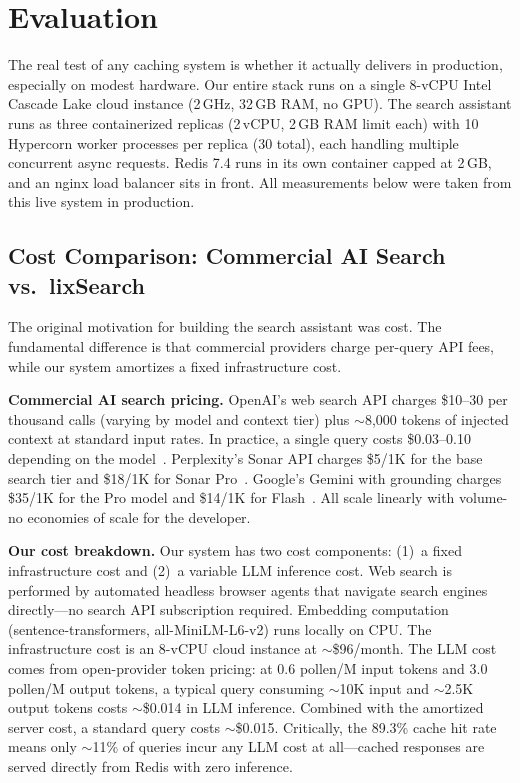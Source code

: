 \documentclass[conference]{IEEEtran}
\begin{document}
\section{Evaluation}
\label{sec:evaluation}

The real test of any caching system is whether it actually delivers in production, especially on modest hardware. Our entire stack runs on a single 8-vCPU Intel Cascade Lake cloud instance (2\,GHz, 32\,GB RAM, no GPU). The search assistant runs as three containerized replicas (2\,vCPU, 2\,GB RAM limit each) with 10 Hypercorn worker processes per replica (30 total), each handling multiple concurrent async requests. Redis 7.4 runs in its own container capped at 2\,GB, and an nginx load balancer sits in front. All measurements below were taken from this live system in production.

\subsection{Cost Comparison: Commercial AI Search vs.\ lixSearch}

The original motivation for building the search assistant was cost. The fundamental difference is that commercial providers charge per-query API fees, while our system amortizes a fixed infrastructure cost.

\textbf{Commercial AI search pricing.} OpenAI's web search API charges \$10--30 per thousand calls (varying by model and context tier) plus ${\sim}$8{,}000 tokens of injected context at standard input rates. In practice, a single query costs \$0.03--0.10 depending on the model~\cite{openai_search_pricing, openai_search_billing}. Perplexity's Sonar API charges \$5/1K for the base search tier and \$18/1K for Sonar Pro~\cite{perplexity_pricing}. Google's Gemini with grounding charges \$35/1K for the Pro model and \$14/1K for Flash~\cite{google_grounding_pricing}. All scale linearly with volume-no economies of scale for the developer.

\textbf{Our cost breakdown.} Our system has two cost components: (1)~a fixed infrastructure cost and (2)~a variable LLM inference cost. Web search is performed by automated headless browser agents that navigate search engines directly---no search API subscription required. Embedding computation (sentence-transformers, all-MiniLM-L6-v2) runs locally on CPU. The infrastructure cost is an 8-vCPU cloud instance at ${\sim}$\$96/month. The LLM cost comes from open-provider token pricing: at 0.6 pollen/M input tokens and 3.0 pollen/M output tokens, a typical query consuming ${\sim}$10K input and ${\sim}$2.5K output tokens costs ${\sim}$\$0.014 in LLM inference. Combined with the amortized server cost, a standard query costs ${\sim}$\$0.015. Critically, the 89.3\% cache hit rate means only ${\sim}$11\% of queries incur any LLM cost at all---cached responses are served directly from Redis with zero inference.
\end{document}
